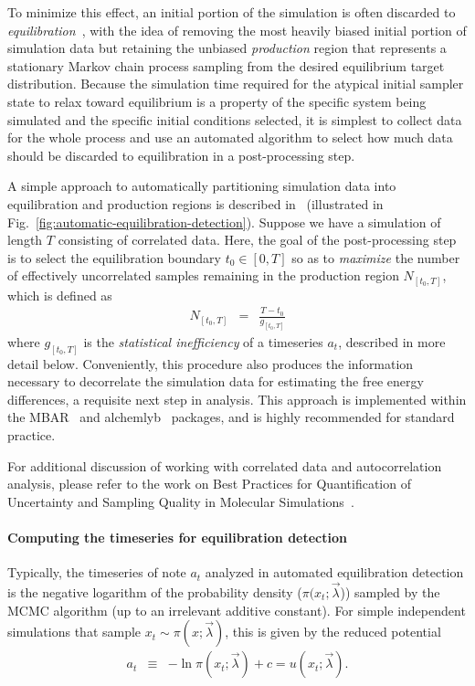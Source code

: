 \documentclass[9pt,bestpractices]{livecoms}
\begin{document}
To minimize this effect, an initial portion of the simulation is often discarded to \emph{equilibration}~\cite{braun2019best}, with the idea of removing the most heavily biased initial portion of simulation data but retaining the unbiased \emph{production} region that represents a stationary Markov chain process sampling from the desired equilibrium target distribution.
Because the simulation time required for the atypical initial sampler state to relax toward equilibrium is a property of the specific system being simulated and the specific initial conditions selected, it is simplest to collect data for the whole process and use an automated algorithm to select how much data should be discarded to equilibration in a post-processing step.

A simple approach to automatically partitioning simulation data into equilibration and production regions is described in~\cite{chodera2016simple} (illustrated in Fig.~\ref{fig:automatic-equilibration-detection}).
Suppose we have a simulation of length $T$ consisting of correlated data.
Here, the goal of the post-processing step is to select the equilibration boundary $t_0 \in [0, T]$ so as to \emph{maximize} the number of effectively uncorrelated samples remaining in the production region $N_{[t_0,T]}$, which is defined as
\begin{eqnarray}
N_{[t_0,T]} &=& \frac{T - t_0}{g_{[t_0,T]}}
\end{eqnarray}
where $g_{[t_0,T]}$ is the \emph{statistical inefficiency} of a timeseries $a_t$, described in more detail below.
Conveniently, this procedure also produces the information necessary to decorrelate the simulation data for estimating the free energy differences, a requisite next step in analysis.
This approach is implemented within the MBAR~\cite{kylebeauchamp2019choderalab} and alchemlyb~\cite{daviddotson2019alchemistry} packages, and is highly recommended for standard practice.

For additional discussion of working with correlated data and autocorrelation analysis, please refer to the work on Best Practices for Quantification of Uncertainty and Sampling Quality in Molecular Simulations~\cite{grossfield2018best}.

\paragraph{Computing the timeseries for equilibration detection}
Typically, the timeseries of note $a_t$ analyzed in automated equilibration detection is the negative logarithm of the probability density ($\pi(x_t; \vec{\lambda}$)) sampled by the MCMC algorithm (up to an irrelevant additive constant).
For simple independent simulations that sample $x_t \sim \pi(x ; \vec{\lambda})$, this is given by the reduced potential
\begin{eqnarray}
a_t &\equiv& - \ln \pi(x_t; \vec{\lambda}) + c = u(x_t; \vec{\lambda}) .
\end{eqnarray}
\end{document}
